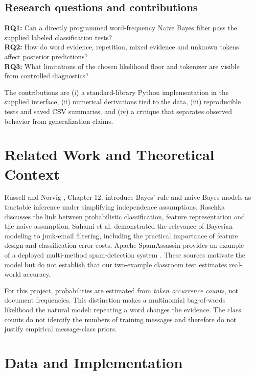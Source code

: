 \documentclass[11pt,letterpaper]{article}
\begin{document}
\subsection{Research questions and contributions}
\noindent\textbf{RQ1:} Can a directly programmed word-frequency Naive Bayes filter pass the supplied labeled classification tests?\\
\textbf{RQ2:} How do word evidence, repetition, mixed evidence and unknown tokens affect posterior predictions?\\
\textbf{RQ3:} What limitations of the chosen likelihood floor and tokenizer are visible from controlled diagnostics?

The contributions are (i) a standard-library Python implementation in the supplied interface, (ii) numerical derivations tied to the data, (iii) reproducible tests and saved CSV summaries, and (iv) a critique that separates observed behavior from generalization claims.

\section{Related Work and Theoretical Context}
Russell and Norvig \citep{russell2022}, Chapter 12, introduce Bayes' rule and naive Bayes models as tractable inference under simplifying independence assumptions. Raschka \citep{raschka2014} discusses the link between probabilistic classification, feature representation and the naive assumption. Sahami et al. \citep{sahami1998} demonstrated the relevance of Bayesian modeling to junk-email filtering, including the practical importance of feature design and classification error costs. Apache SpamAssassin provides an example of a deployed multi-method spam-detection system \citep{spamassassin}. These sources motivate the model but do not establish that our two-example classroom test estimates real-world accuracy.

For this project, probabilities are estimated from \emph{token occurrence counts}, not document frequencies. This distinction makes a multinomial bag-of-words likelihood the natural model: repeating a word changes the evidence. The class counts do not identify the numbers of training messages and therefore do not justify empirical message-class priors.

\section{Data and Implementation}
\end{document}
